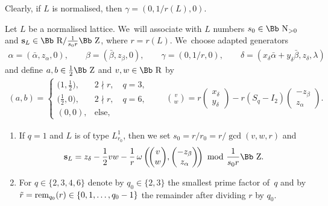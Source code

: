 \documentclass[pdftex]{sigma}
\newcommand\RR{{\mbox{\Bb R}}}
\newcommand\NN{{\mbox{\Bb N}}}
\newcommand\ZZ{{\mbox{\Bb Z}}}
\newcommand\bs{\textbf{{\rm \textbf{s}}}}
\newcommand{\rem}{\mathop{{\rm rem}}}
\numberwithin{equation}{section}
\begin{document}
Clearly, if $L$ is normalised, then $\gamma=(0,1/r(L),0)$.
%
\begin{Definition}\label{de:inv}
Let $L$ be a normalised lattice. We~will associate with $L$ numbers $s_0\in\NN_{>0}$ and $\bs_L \in \RR/ \frac1{s_0 r}\ZZ $, where $r=r(L)$. We~choose adapted generators
\begin{gather}\label{eq:generators}
\alpha=(\bar\alpha,z_\alpha,0),\qquad
\beta=(\bar\beta,z_\beta,0),\qquad
\gamma=(0,1/r,0),\qquad
\delta=(x_\delta\bar\alpha+y_\delta\bar\beta,z_\delta,\lambda)
\end{gather}
and define $a,b\in \frac12 \ZZ$ and $v,w\in\RR$ by
\begin{gather}\label{abvw}
(a,b)=\begin{cases} \big(1,\frac12\big),& 2\nmid r, \quad q=3,
\\
\big(\frac12,0\big),& 2\nmid r,\quad q=6,
\\
(0,0),& \text{else},
\end{cases}
\qquad
{v\choose w}=r\begin{pmatrix}x_\delta\\y_\delta\end{pmatrix}
-r(S_q-I_2)\begin{pmatrix}-z_\beta\\z_\alpha\end{pmatrix}\!.
\end{gather}
\begin{enumerate}\itemsep=0pt
\item If $q=1$ and $L$ is of type $L^1_{r_0}$, then we set $s_0=r/r_0=r/\gcd(v,w,r)$ and
\begin{gather*}
\bs_L=z_\delta-\frac{1}{2}vw-\frac{1}{r}\,\omega
\left(\!\begin{pmatrix}v\\w\end{pmatrix}\!,\begin{pmatrix}-z_\beta\\z_\alpha\end{pmatrix}\!\right)
\ {\rm mod}\ \frac{1}{s_0r}\ZZ.
\end{gather*}
\item For $q\in\{2,3,4,6\}$ denote by $q_0\in\{2,3\}$ the smallest prime factor of~$q$ and by $\tilde r=\rem_{q_0}(r)\in\{0,1,\dots,q_0-1\}$ the remainder after dividing $r$ by $q_0$.
\begin{enumerate}\itemsep=0pt

\end{enumerate}
\end{enumerate}
\end{Definition}
\end{document}
